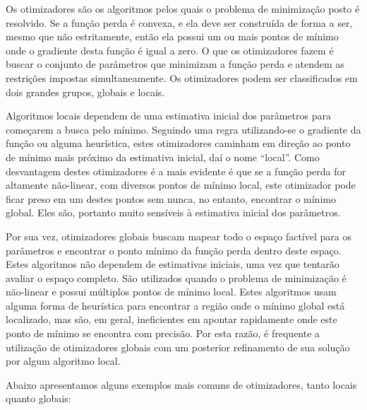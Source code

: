 \documentclass[]{book}
\theoremstyle{definition}
\theoremstyle{definition}
\theoremstyle{definition}
\theoremstyle{remark}
\begin{document}
Os otimizadores são os algoritmos pelos quais o problema de minimização posto é resolvido. Se a função perda é convexa, e ela deve ser construída de forma a ser, mesmo que não estritamente, então ela possui um ou mais pontos de mínimo onde o gradiente desta função é igual a zero. O que os otimizadores fazem é buscar o conjunto de parâmetros que minimizam a função perda e atendem as restrições impostas simultaneamente. Os otimizadores podem ser classificados em dois grandes grupos, globais e locais.

Algoritmos locais dependem de uma estimativa inicial dos parâmetros para começarem a busca pelo mínimo. Seguindo uma regra utilizando-se o gradiente da função ou alguma heurística, estes otimizadores caminham em direção ao ponto de mínimo mais próximo da estimativa inicial, daí o nome ``local''. Como desvantagem destes otimizadores é a mais evidente é que se a função perda for altamente não-linear, com diversos pontos de mínimo local, este otimizador pode ficar preso em um destes pontos sem nunca, no entanto, encontrar o mínimo global. Eles são, portanto muito sensíveis à estimativa inicial dos parâmetros.

Por sua vez, otimizadores globais buscam mapear todo o espaço factível para os parâmetros e encontrar o ponto mínimo da função perda dentro deste espaço. Estes algoritmos não dependem de estimativas iniciais, uma vez que tentarão avaliar o espaço completo. São utilizados quando o problema de minimização é não-linear e possui múltiplos pontos de mínimo local. Estes algoritmos usam alguma forma de heurística para encontrar a região onde o mínimo global está localizado, mas são, em geral, ineficientes em apontar rapidamente onde este ponto de mínimo se encontra com precisão. Por esta razão, é frequente a utilização de otimizadores globais com um posterior refinamento de sua solução por algum algoritmo local.

Abaixo apresentamos alguns exemplos mais comuns de otimizadores, tanto locais quanto globais:
\end{document}
